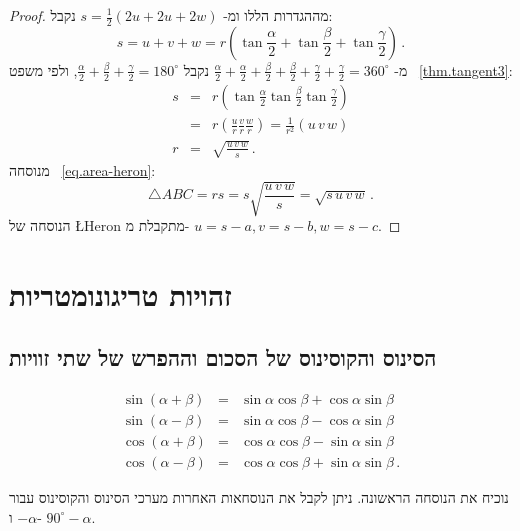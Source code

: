 \begin{proof}
מההגדרות הללו ומ-%
$s=\frac{1}{2}(2u+2u+2w)$
נקבל:
\[
s = u+v+w = r\left(\tan \frac{\alpha}{2}+\tan \frac{\beta}{2}+\tan \frac{\gamma}{2}\right)\,.
\]
מ-%
$\frac{\alpha}{2}+\frac{\alpha}{2}+\frac{\beta}{2}+\frac{\beta}{2}+\frac{\gamma}{2}+\frac{\gamma}{2}=360^\circ$
נקבל
$\frac{\alpha}{2}+\frac{\beta}{2}+\frac{\gamma}{2}=180^\circ$,
ולפי משפט%
~\ref{thm.tangent3}:
\begin{eqnarray*}
s&=&r\left(\tan \frac{\alpha}{2}\tan \frac{\beta}{2}\tan \frac{\gamma}{2}\right)\\
&=&r\left(\frac{u}{r}\frac{v}{r}\frac{w}{r}\right)=\frac{1}{r^2}(u\,v\,w)\\
r&=&\sqrt{\displaystyle\frac{u\,v\,w}{s}}\,.
\end{eqnarray*}
מנוסחה%
~\ref{eq.area-heron}:
\[
\triangle ABC=rs=s\sqrt{\displaystyle\frac{u\,v\,w}{s}}=\sqrt{s\,u\,v\,w}\,.
\]
הנוסחה של 
\L{Heron}
מתקבלת מ-%
$u=s-a, v=s-b, w=s-c$.
\end{proof}


\section{זהויות טריגונומטריות}\label{a.trig-identities}


\subsection{הסינוס והקוסינוס של הסכום וההפרש של שתי זוויות} \label{s.sum-of-trig}

\begin{theorem}\label{thm.sum-of-trig}
\begin{eqnarray*}
\sin(\alpha+\beta) &=& \sin\alpha\cos\beta + \cos\alpha\sin\beta\\
\sin(\alpha-\beta) &=& \sin\alpha\cos\beta - \cos\alpha\sin\beta\\
\cos(\alpha+\beta) &=& \cos\alpha\cos\beta - \sin\alpha\sin\beta\\
\cos(\alpha-\beta) &=& \cos\alpha\cos\beta + \sin\alpha\sin\beta\,.
\end{eqnarray*}
\end{theorem}
נוכיח את הנוסחה הראשונה. ניתן לקבל את הנוסחאות האחרות מערכי הסינוס והקוסינוס עבור 
$-\alpha$
ו-%
$90^\circ-\alpha$.

